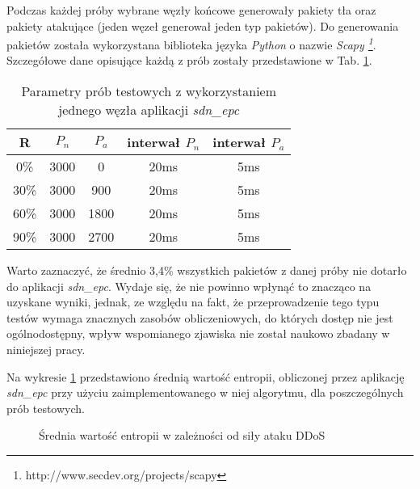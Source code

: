 Podczas każdej próby wybrane węzły końcowe generowały pakiety tła oraz
pakiety atakujące (jeden węzeł generował jeden typ pakietów). Do generowania
pakietów została wykorzystana biblioteka języka \textit{Python} o nazwie
\textit{ Scapy \footnote{http://www.secdev.org/projects/scapy}}. Szczegółowe
dane opisujące każdą z prób zostały przedstawione w Tab. \ref{tab:entropy}.

\begin{table}[h!]
\centering
\begin{tabular}{ |c|c|c|c|c| } 
 \hline
 R & $P_{n}$ & $P_{a}$ & interwał $P_{n}$ & interwał $P_{a}$ \\
 \hline
 0\% & 3000 & 0 & 20ms & 5ms \\ 
 \hline
 30\% & 3000 & 900 & 20ms & 5ms \\ 
 \hline
 60\% & 3000 & 1800 & 20ms & 5ms \\ 
 \hline
 90\% & 3000 & 2700 & 20ms & 5ms \\ 
 \hline
\end{tabular}
\caption{Parametry prób testowych z wykorzystaniem jednego węzła aplikacji
  \textit{sdn\_epc}} 
\label{tab:entropy}
\end{table}

Warto zaznaczyć, że średnio 3,4\% wszystkich pakietów z danej próby nie dotarło
do aplikacji \textit{sdn\_epc}. Wydaje się, że nie powinno wpłynąć to znacząco
na uzyskane wyniki, jednak, ze względu na fakt, że przeprowadzenie tego typu
testów wymaga znacznych zasobów obliczeniowych, do których dostęp nie jest
ogólnodostępny, wpływ wspomianego zjawiska nie został naukowo zbadany w
niniejszej pracy.

Na wykresie \ref{plot:entropy} przedstawiono średnią wartość entropii,
obliczonej przez aplikację \textit{sdn\_epc} przy użyciu zaimplementowanego w
niej algorytmu, dla poszczególnych prób testowych.

\begin{figure}[h]
\centering
{}
\caption{Średnia wartość entropii w zależności od siły ataku DDoS}
\label{plot:entropy}
\end{figure}
\newpage


